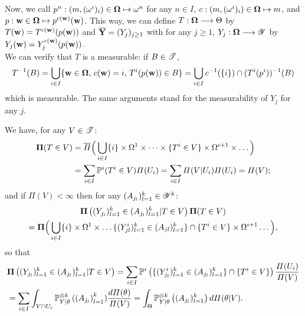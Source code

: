 Now, we call $p^n:(m,(\omega^i)_i)\in\mathbf{\Omega}\mapsto \omega^n$ for any $n\in I$, $c:(m,(\omega^i)_i)\in\mathbf{\Omega}\mapsto m$, and $p:\mathbf{w}\in\mathbf{\Omega}\mapsto p^{c(\mathbf{w})}(\mathbf{w})$.
This way, we can define $T:\mathbf{\Omega}\longrightarrow\Theta$ by $T(\mathbf{w})=T^{c(\mathbf{w})}(p(\mathbf{w}))$ and $\overline{\mathbf{Y}}=(Y_j)_{j\geq1}$ with for any $j\geq1$, $Y_j:\mathbf{\Omega}\longrightarrow\mathscr{Y}$ by $Y_j(\mathbf{w})=Y_j^{c(\mathbf{w})}(p(\mathbf{w}))$.\\
We can verify that $T$ is a measurable: if $B\in\mathscr{T}$,  
    \begin{equation}
        T^{-1}(B) = \bigcup_{i\in I}\{\mathbf{w}\in\mathbf{\Omega},\, c(\mathbf{w})=i,\,T^i(p(\mathbf{w}))\in B  \} = \bigcup_{i\in I}c^{-1}(\{i\})\cap (T^i(p^i))^{-1}(B)
    \end{equation}
which is measurable. 
The same arguments stand for the measurability of $Y_j$ for any $j$.







We have,
for any $V\in\mathscr{T}$:
    \begin{align}
          \mathbf{\Pi}(T\in V) &= \overline{\varPi}\Big(\bigcup_{i\in I}\{i\}\times\Omega^1\times\dots\times\{T^i\in V\}\times\Omega^{i+1}\times\dots\Big)\\
          &=\sum_{i\in I}\mathbb{P}^i(T^i\in V)\varPi(U_i) = \sum_{i\in I}\varPi(V|U_i)\varPi(U_i) = \varPi(V);\nonumber
    \end{align}
and if $\varPi(V)<\infty$ then for any $(A_{j_l})_{l=1}^k\in\mathscr{Y}^k$: %
    \begin{multline}
        \mathbf{\Pi}\left((Y_{j_l})_{l=1}^k\in(A_{j_l})_{l=1}^k|T\in V\right)\mathbf{\Pi}(T\in V) \\ = 
        \mathbf{\Pi}\Big(\bigcup_{i\in I}  \{i\}\times\Omega^1\times\dots\{(Y^i_{jl})_{l=1}^k\in(A_{jl})_{l=1}^k\}\cap \{T^i\in V \}\times\Omega^{i+1}\dots 
        \Big),
    \end{multline}
    so that
        \begin{align}\nonumber
        &\mathbf{\Pi}\left((Y_{j_l})_{l=1}^k\in(A_{j_l})_{l=1}^k|T\in V\right) 
            = \sum_{i\in I}\mathbb{P}^i\left( \{(Y_{j_l}^i)_{l=1}^k\in(A_{j_l})_{l=1}^k\}\cap \{T^i\in V\}\right)\frac{\varPi(U_i)}{\varPi(V)} \\
            &= \sum_{i\in I}\int_{V\cap U_i}\mathbb{P}^{\otimes k}_{Y|\theta}\left((A_{j_l}\right)_{l=1}^k)\frac{d\varPi(\theta)}{\varPi(V)}  = \int_\Theta\mathbb{P}^{\otimes k}_{Y|\theta}\left((A_{j_l})_{l=1}^k\right)d\varPi(\theta|V).
    \end{align}


